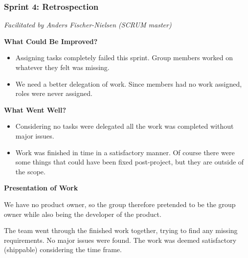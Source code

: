 \subsubsection{Sprint 4: Retrospection}
\label{sec:sprint4}
\small{\textit{Facilitated by Anders Fischer-Nielsen (SCRUM master)}} 

\textbf{What Could Be Improved?}

\begin{itemize}
	\item Assigning tasks completely failed this sprint. Group members worked on whatever they felt was missing.
	\item We need a better delegation of work. Since members had no work assigned, roles were never assigned.
\end{itemize}

\textbf{What Went Well?}

\begin{itemize}
	\item Considering no tasks were delegated all the work was completed without major issues. 
	\item Work was finished in time in a satisfactory manner. Of course there were some things that could have been fixed post-project, but they are outside of the scope. 
\end{itemize}

\textbf{Presentation of Work}

We have no product owner, so the group therefore pretended to be the group owner while also being the developer of the product.

The team went through the finished work together, trying to find any missing requirements. 
No major issues were found. The work was deemed satisfactory (shippable) considering the time frame.
